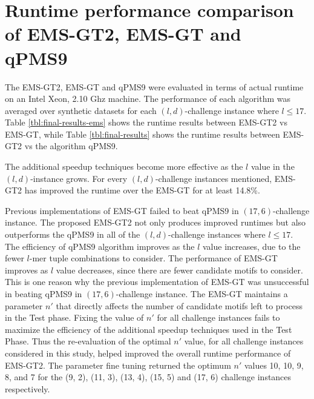 	



\section{Runtime performance comparison of EMS-GT2, EMS-GT and qPMS9}
The EMS-GT2, EMS-GT and qPMS9 were evaluated in terms of actual runtime on an Intel Xeon, 2.10 Ghz machine. The performance of each algorithm was averaged over synthetic datasets for each $(l, d)$-challenge instance where $l \leq 17$. Table \ref{tbl:final-results-ems} shows the runtime results between EMS-GT2 vs EMS-GT, while Table \ref{tbl:final-results} shows the runtime results between EMS-GT2 vs the algorithm qPMS9.




The additional speedup techniques become more effective as the $l$ value in the $(l, d)$-instance grows. For every $(l, d)$-challenge instances mentioned, EMS-GT2 has improved the runtime over the EMS-GT for at least 14.8\%. 



Previous implementations of EMS-GT failed to beat qPMS9 in $(17, 6)$-challenge instance. The proposed EMS-GT2 not only produces improved runtimes but also outperforms the qPMS9 in all of the $(l, d)$-challenge instances where $l \leq 17$. The efficiency of qPMS9 algorithm improves as the $l$ value increases, due to the fewer $l$-mer tuple combinations to consider. The performance of EMS-GT improves as $l$ value decreases, since there are fewer candidate motifs to consider. This is one reason why the previous implementation of EMS-GT was unsuccessful in beating qPMS9 in $(17, 6)$-challenge instance. The EMS-GT maintains a parameter $n'$ that directly affects the number of candidate motifs left to process in the Test phase. Fixing the value of $n'$ for all challenge instances fails to maximize the efficiency of the additional speedup techniques used in the Test Phase. Thus the re-evaluation of the optimal $n'$ value, for all challenge instances considered in this study, helped improved the overall runtime performance of EMS-GT2. The parameter fine tuning returned the optimum $n'$ values 10, 10, 9, 8, and 7 for the (9, 2), (11, 3), (13, 4), (15, 5) and (17, 6) challenge instances respectively.

